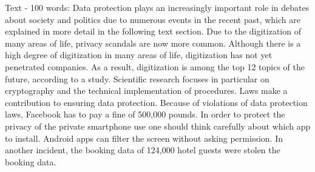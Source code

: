 \documentclass{article}
\begin{document}
Text - 100 words:
\newline
\newline
\newline
Data protection plays an increasingly important role in debates about society and politics due to numerous events in the recent past, which are explained in more detail in the following text section.
\newline
\newline
Due to the digitization of many areas of life, privacy scandals are now more common.
Although there is a high degree of digitization in many areas of life, digitization has not yet penetrated companies. As a result, digitization is among the top 12 topics of the future, according to a study.\cite{gadatsch_it-sicherheit:_2017}
\newline
\newline
Scientific research focuses in particular on cryptography and the technical implementation of procedures.\cite{gabriel_it-sicherheit_2006}
\newline
\newline
Laws make a contribution to ensuring data protection. Because of violations of data protection laws, Facebook has to pay a fine of 500,000 pounds.\cite{online_datenskandal:_nodate}
\newline
\newline
In order to protect the privacy of the private smartphone use one should think carefully about which app to install. Android apps can filter the screen without asking permission.\cite{online_forscher:_nodate}
\newline
\newline
In another incident, the booking data of 124,000 hotel guests were stolen the booking data.\cite{security_datenleck_nodate}

\newpage

\end{document}
